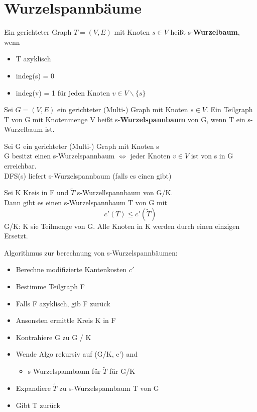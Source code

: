\documentclass[14pt]{article}
\begin{document}
\section{Wurzelspannbäume}
\begin{definition}[Wurzelbaum]
    Ein gerichteter Graph $T = (V, E)$ mit Knoten $s \in V$ heißt 
    s-\textbf{Wurzelbaum}, wenn
    \begin{itemize}
        \item T azyklisch
        \item indeg(s) = 0
        \item indeg(v) = 1 für jeden Knoten $ v \in V \backslash \{s\}$
    \end{itemize}
\end{definition}
\begin{definition}[Wurzelspannbaum]
    Sei $G = (V, E)$ ein gerichteter (Multi-) Graph mit Knoten $s \in V$.
    Ein Teilgraph T von G mit Knotenmenge V heißt s-\textbf{Wurzelspannbaum}
    von G, wenn T ein s-Wurzelbaum ist.
\end{definition}
\begin{eigenschaft}
    Sei G ein gerichteter (Multi-) Graph mit Knoten s \\
    G besitzt einen s-Wurzelspannbaum $\Leftrightarrow$ jeder Knoten $v \in V$
    ist von s in G erreichbar. \\
    DFS(s) liefert s-Wurzelspannbaum (falls es einen gibt)
\end{eigenschaft}
\begin{eigenschaft}
    Sei K Kreis in F und $\tilde{T}$ s-Wurzellspannbaum von G/K. \\
    Dann gibt es einen s-Wurzelspannbaum T von G mit \\
    \[
        c'(T) \leq c'(\tilde{T})  
    \]
    G/K: K sie Teilmenge von G. Alle Knoten in K werden durch einen einzigen 
    Ersetzt.
\end{eigenschaft}
Algorithmus zur berechnung von s-Wurzelspannbäumen:
\begin{itemize}
    \item Berechne modifizierte Kantenkosten $c'$
    \item Bestimme Teilgraph F
    \item Falls F azyklisch, gib F zurück
    \item Ansonsten ermittle Kreis K in F
    \item Kontrahiere G zu G / K
    \item Wende Algo rekursiv auf (G/K, c') and
    \begin{itemize}
        \item s-Wurzelspannbaum für $\tilde{T}$ für G/K
    \end{itemize}
    \item Expandiere $\tilde{T}$ zu s-Wurzelspannbaum T von G
    \item Gibt T zurück
\end{itemize}
\end{document}

